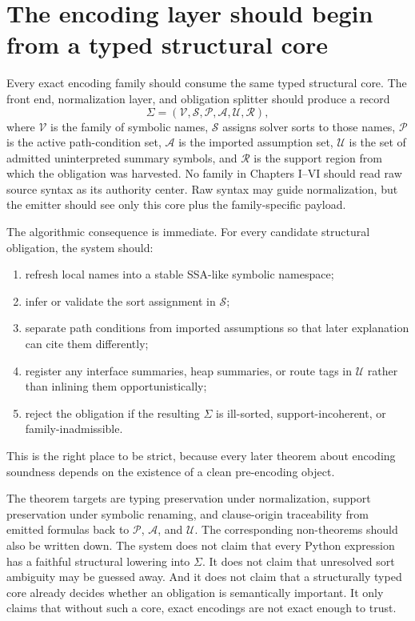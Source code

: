 \documentclass[11pt]{report}
\begin{document}
\section{The encoding layer should begin from a typed structural core}
Every exact encoding family should consume the same typed structural core. The front end, normalization layer, and obligation splitter should produce a record
\[
\Sigma = (\mathcal{V}, \mathcal{S}, \mathcal{P}, \mathcal{A}, \mathcal{U}, \mathcal{R}),
\]
where $\mathcal{V}$ is the family of symbolic names, $\mathcal{S}$ assigns solver sorts to those names, $\mathcal{P}$ is the active path-condition set, $\mathcal{A}$ is the imported assumption set, $\mathcal{U}$ is the set of admitted uninterpreted summary symbols, and $\mathcal{R}$ is the support region from which the obligation was harvested. No family in Chapters I--VI should read raw source syntax as its authority center. Raw syntax may guide normalization, but the emitter should see only this core plus the family-specific payload.

The algorithmic consequence is immediate. For every candidate structural obligation, the system should:
\begin{enumerate}
\item refresh local names into a stable SSA-like symbolic namespace;
\item infer or validate the sort assignment in $\mathcal{S}$;
\item separate path conditions from imported assumptions so that later explanation can cite them differently;
\item register any interface summaries, heap summaries, or route tags in $\mathcal{U}$ rather than inlining them opportunistically;
\item reject the obligation if the resulting $\Sigma$ is ill-sorted, support-incoherent, or family-inadmissible.
\end{enumerate}
This is the right place to be strict, because every later theorem about encoding soundness depends on the existence of a clean pre-encoding object.

The theorem targets are typing preservation under normalization, support preservation under symbolic renaming, and clause-origin traceability from emitted formulas back to $\mathcal{P}$, $\mathcal{A}$, and $\mathcal{U}$. The corresponding non-theorems should also be written down. The system does not claim that every Python expression has a faithful structural lowering into $\Sigma$. It does not claim that unresolved sort ambiguity may be guessed away. And it does not claim that a structurally typed core already decides whether an obligation is semantically important. It only claims that without such a core, exact encodings are not exact enough to trust.
\end{document}
